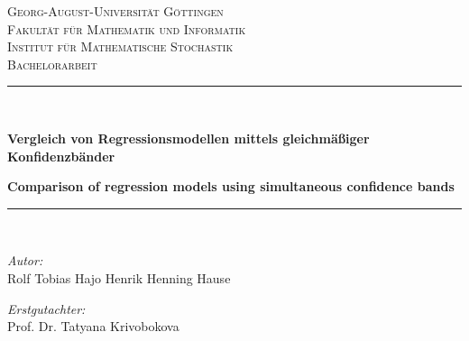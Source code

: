 \documentclass[12pt,a4paper]{article}
\theoremstyle{definition}
\theoremstyle{definition}
\theoremstyle{definition}
\theoremstyle{definition}
\begin{document}
\begin{titlepage}

\begin{center}



\textsc{\LARGE Georg-August-Universität Göttingen}\\
\textsc{Fakultät für Mathematik und Informatik}\\
\textsc{Institut für Mathematische Stochastik}\\[1.5cm]


\textsc{\Large Bachelorarbeit}\\[0.5cm]


\newcommand{\HRule}{\rule{\linewidth}{0.5mm}}
\HRule \\[0.4cm]
\begin{onehalfspace}
{ \LARGE \bfseries  Vergleich von Regressionsmodellen mittels gleichmäßiger Konfidenzbänder  }\\[0.4cm]
\end{onehalfspace}
{ \large \bfseries Comparison of regression models using simultaneous confidence bands}\\[0.4cm]

\HRule \\[1cm]


\begin{minipage}{0.4\textwidth}
\begin{flushleft} \large
\emph{Autor:}\\
Rolf Tobias Hajo Henrik Henning Hause\\
\end{flushleft}
\end{minipage}
\hfill
\begin{minipage}{0.4\textwidth}
\begin{flushright} \large
\emph{Erstgutachter:} \\
Prof. Dr. Tatyana Krivobokova\\
\end{flushright}
\end{minipage}
\vspace{0.3cm}


\end{center}
\end{titlepage}
\end{document}
